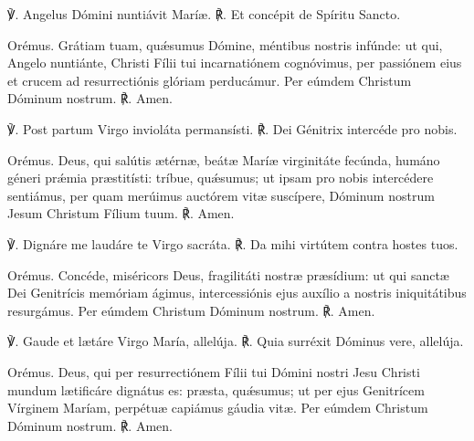 ℣. Angelus Dómini nuntiávit Maríæ.
℟. Et concépit de Spíritu Sancto.

Orémus.
Grátiam tuam, quǽsumus Dómine, méntibus nostris infúnde:
ut qui, Angelo nuntiánte, Christi Fílii tui incarnatiónem cognóvimus,
per passiónem eius et crucem ad resurrectiónis glóriam perducámur.
Per eúmdem Christum Dóminum nostrum. 
℟. Amen.


℣. Post partum Virgo invioláta permansísti.
℟. Dei Génitrix intercéde pro nobis.

Orémus.
Deus, qui salútis ætérnæ, 
beátæ Maríæ virginitáte fecúnda,
humáno géneri prǽmia præstitísti:
tríbue, quǽsumus; ut ipsam pro nobis intercédere sentiámus,
per quam merúimus auctórem vitæ suscípere,
Dóminum nostrum Jesum Christum Fílium tuum.
℟. Amen.

\noindent \hrulefill



℣. Dignáre me laudáre te Virgo sacráta.
℟. Da mihi virtútem contra hostes tuos.

Orémus.
Concéde, miséricors Deus, fragilitáti nostræ præsídium:
ut qui sanctæ Dei Genitrícis memóriam ágimus,
intercessiónis ejus auxílio a nostris iniquitátibus resurgámus.
Per eúmdem Christum Dóminum nostrum.
℟. Amen. 

\pagebreak



\vspace{2mm}
℣. Gaude et lætáre Virgo María, allelúja.
℟. Quia surréxit Dóminus vere, allelúja.

\vspace{3mm}
Orémus.
Deus, qui per resurrectiónem Fílii tui Dómini nostri Jesu Christi
mundum lætificáre dignátus es:
præsta, quǽsumus; ut per ejus Genitrícem Vírginem Maríam,
perpétuæ capiámus gáudia vitæ.
Per eúmdem Christum Dóminum nostrum.
℟. Amen. 

\noindent \hrulefill


